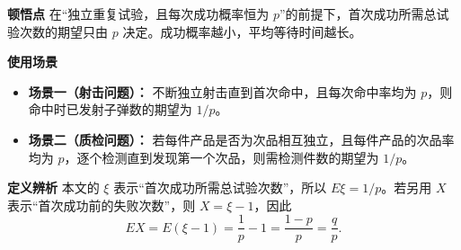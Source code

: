\begin{explanationbox}
	\medskip

	\textbf{\textcolor{CExplanation}{顿悟点}}
	在“独立重复试验，且每次成功概率恒为 $p$”的前提下，首次成功所需总试验次数的期望只由 $p$ 决定。成功概率越小，平均等待时间越长。

	\medskip

	\textbf{\textcolor{CExplanation}{使用场景}}

	\begin{itemize}[leftmargin=*, itemsep=0.5em, topsep=0.4em]
		\item \textbf{场景一（射击问题）：} 不断独立射击直到首次命中，且每次命中率均为 $p$，则命中时已发射子弹数的期望为 $1/p$。
		\item \textbf{场景二（质检问题）：} 若每件产品是否为次品相互独立，且每件产品的次品率均为 $p$，逐个检测直到发现第一个次品，则需检测件数的期望为 $1/p$。
	\end{itemize}

	\medskip

	\textbf{\textcolor{CExplanation}{定义辨析}}
	本文的 $\xi$ 表示“首次成功所需总试验次数”，所以 $E\xi=1/p$。若另用 $X$ 表示“首次成功前的失败次数”，则 $X=\xi-1$，因此
	\[
		EX=E(\xi-1)=\frac{1}{p}-1=\frac{1-p}{p}=\frac{q}{p}.
	\]
\end{explanationbox}
